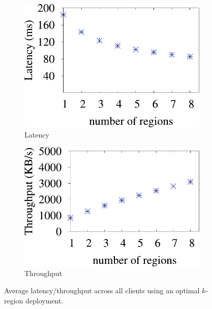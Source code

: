 \begin{figure}[tb]
\centering
	\begin{subfigure}[b]{0.4\textwidth}
                \centering
                \includegraphics[width=\textwidth]{./figures/cloudmeasure/imag_sec5/sec5_region_latency_impr_fix.pdf}
		\caption{Latency}
	\end{subfigure}
	\begin{subfigure}[b]{0.4\textwidth}
                \centering
                \includegraphics[width=\textwidth]{./figures/cloudmeasure/imag_sec5/sec5_region_speed_impr_fix.pdf}
		\caption{Throughput}
	\end{subfigure}
	\caption{Average latency/throughput across all clients using an optimal $k$-region
	deployment.}
	\label{fig:multi_region_latency_bandwidth}
\end{figure}

